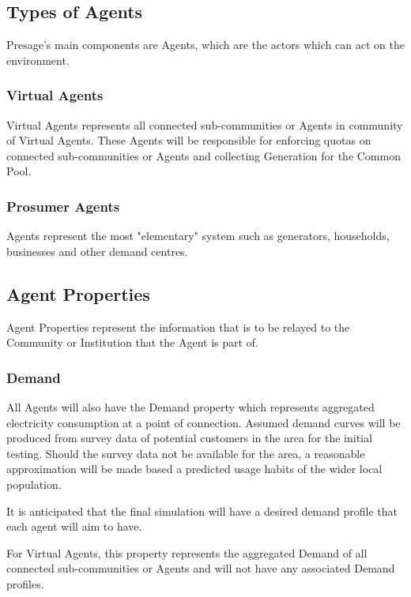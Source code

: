 \subsection*{Types of Agents}
Presage's main components are Agents, which are the actors which can act on the environment.
\subsubsection*{Virtual Agents}
Virtual Agents represents all connected sub-communities or Agents in community of Virtual Agents. These Agents will be responsible for enforcing quotas on connected sub-communities or Agents and collecting Generation for the Common Pool. 

\subsubsection*{Prosumer Agents}
Agents represent the most "elementary" system such as generators, households, businesses and other demand centres.

\subsection*{Agent Properties}
Agent Properties represent the information that is to be relayed to the Community or Institution that the Agent is part of.
\subsubsection*{Demand}
All Agents will also have the Demand property which represents aggregated electricity consumption at a point of connection. Assumed demand curves will be produced from survey data of potential customers in the area for the initial testing. Should the survey data not be available for the area, a reasonable approximation will be made based a predicted usage habits of the wider local population.

It is anticipated that the final simulation will have a desired demand profile that each agent will aim to have. 

For Virtual Agents, this property represents the aggregated Demand of all connected sub-communities or Agents and will not have any associated Demand profiles.

